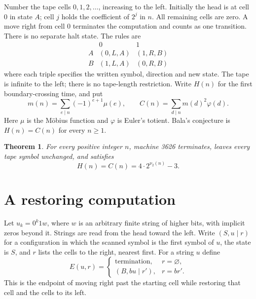 \documentclass[11pt]{article}
\newtheorem{theorem}{Theorem}
\newcommand{\val}{\nu_2}
\begin{document}
Number the tape cells $0,1,2,\ldots$, increasing to the left. Initially the
head is at cell $0$ in state $A$; cell $j$ holds the coefficient of $2^j$
in $n$. All remaining cells are zero. A move right from cell $0$ terminates
the computation and counts as one transition. There is no separate halt
state. The rules are
\[
\begin{array}{c|cc}
 &0&1\\\hline
A&(0,L,A)&(1,R,B)\\
B&(1,L,A)&(0,R,B)
\end{array}
\]
where each triple specifies the written symbol, direction and new state.
The tape is infinite to the left; there is no tape-length restriction.
Write $H(n)$ for the first boundary-crossing time, and put
\[
 m(n)=\sum_{e\mid n}(-1)^{e+1}\mu(e),
 \qquad C(n)=\sum_{d\mid n}m(d)^2\varphi(d).
\]
Here $\mu$ is the M\"obius function and $\varphi$ is Euler's totient.
Bala's conjecture is $H(n)=C(n)$ for every $n\geq1$.

\begin{theorem}\label{thm:main}
For every positive integer $n$, machine 3626 terminates, leaves every tape
symbol unchanged, and satisfies
\[
 H(n)=C(n)=4\cdot2^{\val(n)}-3.
\]
\end{theorem}

\section{A restoring computation}
Let $u_k=0^k1w$, where $w$ is an arbitrary finite string of higher bits,
with implicit zeros beyond it. Strings are read from the head toward the
left. Write $(S,u\mid r)$ for a configuration in which the scanned symbol
is the first symbol of $u$, the state is $S$, and $r$ lists the cells to
the right, nearest first. For a string $u$ define
\[
 E(u,r)=
 \begin{cases}
 \text{termination},&r=\varnothing,\\
 (B,bu\mid r'),&r=br'.
 \end{cases}
\]
This is the endpoint of moving right past the starting cell while restoring
that cell and the cells to its left.
\end{document}
